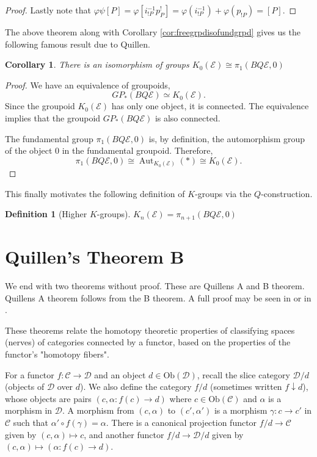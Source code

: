 \documentclass[12pt]{report}
\numberwithin{equation}{section}
\newtheorem{definition}[dummy]{Definition}
\newtheorem{corollary}[dummy]{Corollary}
\begin{document}
\begin{proof}
			
			Lastly note that \( \varphi \psi [P]=\varphi[i^{-1}_{!P} p^!_P]=\varphi(i^{-1}_{!P})+ \varphi(p_{!P})=[P] \). 	
		\end{proof}
		
	
	The above theorem along with Corollary \ref{cor:freegrpdisofundgrpd} gives us the following famous result due to Quillen.
	\begin{corollary}
			There is an isomorphism of groups \( K_0(\mathcal{E}) \cong \pi_1(BQ\mathcal{E},0) \)
	\end{corollary}
	\begin{proof}
		 We have an equivalence of groupoids,
		 \[  GP_*(BQ \mathcal{E}) \simeq K_0(\mathcal{E}). \]
		 Since the groupoid $K_0(\mathcal{E})$ has only one object, it is connected. The equivalence implies that the groupoid $GP_*(BQ\mathcal{E})$ is also connected.
		 
		 The fundamental group $\pi_1(BQ\mathcal{E}, 0)$ is, by definition, the automorphism group of the object $0$ in the fundamental groupoid. Therefore,
		 \[ \pi_1(BQ\mathcal {E}, 0) \cong \operatorname{Aut}_{K_0(\mathcal{E})}(*) \cong K_0(\mathcal{E}). \]
		 
	\end{proof}
	
	This finally motivates the following definition of \( K \)-groups via the \( Q \)-construction.
	\begin{definition}[Higher $K$-groups]
		\(K_n(\mathcal{E})= \pi_{n+1}(BQ\mathcal{E},0)\)
	\end{definition}
	
	\section{Quillen's Theorem B}
	We end with two theorems without proof. These are Quillens A and B theorem. Quillens A theorem follows from the B theorem. A full proof may be seen in \cite{quillenhigherktheoryI} or in \cite{Goerss_Jardine_2009}.	

	
	These theorems relate the homotopy theoretic properties of classifying spaces (nerves) of categories connected by a functor, based on the properties of the functor's "homotopy fibers".

	
	For a functor $f: \mathcal{C} \to \mathcal{D}$ and an object $d \in \mathrm{Ob}(\mathcal{D})$, recall the slice category $\mathcal{D}/d$ (objects of $\mathcal{D}$ over $d$). We also define the category $f/d$ (sometimes written $f \downarrow d$), whose objects are pairs $(c, \alpha: f(c) \to d)$ where $c \in \mathrm{Ob}(\mathcal{C})$ and $\alpha$ is a morphism in $\mathcal{D}$. A morphism from $(c, \alpha)$ to $(c', \alpha')$ is a morphism $\gamma: c \to c'$ in $\mathcal{C}$ such that $\alpha' \circ f(\gamma) = \alpha$. There is a canonical projection functor $f/d \to \mathcal{C}$ given by $(c, \alpha) \mapsto c$, and another functor $f/d \to \mathcal{D}/d$ given by $(c, \alpha) \mapsto (\alpha: f(c) \to d)$.
	
\end{document}
